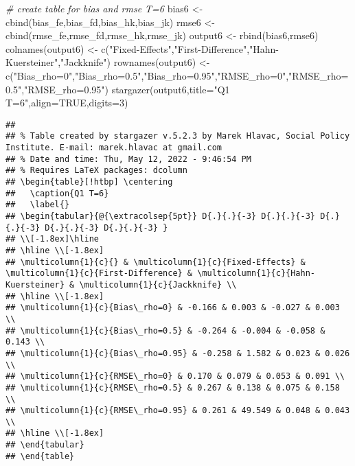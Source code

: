 \documentclass[
]{article}
\newenvironment{Shaded}{\begin{snugshade}}{\end{snugshade}}
\newcommand{\AttributeTok}[1]{\textcolor[rgb]{0.77,0.63,0.00}{#1}}
\newcommand{\CommentTok}[1]{\textcolor[rgb]{0.56,0.35,0.01}{\textit{#1}}}
\newcommand{\ConstantTok}[1]{\textcolor[rgb]{0.00,0.00,0.00}{#1}}
\newcommand{\DecValTok}[1]{\textcolor[rgb]{0.00,0.00,0.81}{#1}}
\newcommand{\FunctionTok}[1]{\textcolor[rgb]{0.00,0.00,0.00}{#1}}
\newcommand{\NormalTok}[1]{#1}
\newcommand{\OtherTok}[1]{\textcolor[rgb]{0.56,0.35,0.01}{#1}}
\newcommand{\StringTok}[1]{\textcolor[rgb]{0.31,0.60,0.02}{#1}}
\begin{document}
\begin{Shaded}
\begin{Highlighting}[]
\CommentTok{\# create table for bias and rmse T=6}
\NormalTok{bias6 }\OtherTok{\textless{}{-}} \FunctionTok{cbind}\NormalTok{(bias\_fe,bias\_fd,bias\_hk,bias\_jk)}
\NormalTok{rmse6 }\OtherTok{\textless{}{-}} \FunctionTok{cbind}\NormalTok{(rmse\_fe,rmse\_fd,rmse\_hk,rmse\_jk)}
\NormalTok{output6 }\OtherTok{\textless{}{-}} \FunctionTok{rbind}\NormalTok{(bias6,rmse6)}
\FunctionTok{colnames}\NormalTok{(output6) }\OtherTok{\textless{}{-}} \FunctionTok{c}\NormalTok{(}\StringTok{"Fixed{-}Effects"}\NormalTok{,}\StringTok{"First{-}Difference"}\NormalTok{,}\StringTok{"Hahn{-}Kuersteiner"}\NormalTok{,}\StringTok{"Jackknife"}\NormalTok{)}
\FunctionTok{rownames}\NormalTok{(output6) }\OtherTok{\textless{}{-}} \FunctionTok{c}\NormalTok{(}\StringTok{"Bias\_rho=0"}\NormalTok{,}\StringTok{"Bias\_rho=0.5"}\NormalTok{,}\StringTok{"Bias\_rho=0.95"}\NormalTok{,}\StringTok{"RMSE\_rho=0"}\NormalTok{,}\StringTok{"RMSE\_rho=0.5"}\NormalTok{,}\StringTok{"RMSE\_rho=0.95"}\NormalTok{)}
\FunctionTok{stargazer}\NormalTok{(output6,}\AttributeTok{title=}\StringTok{"Q1 T=6"}\NormalTok{,}\AttributeTok{align=}\ConstantTok{TRUE}\NormalTok{,}\AttributeTok{digits=}\DecValTok{3}\NormalTok{)}
\end{Highlighting}
\end{Shaded}

\begin{verbatim}
## 
## % Table created by stargazer v.5.2.3 by Marek Hlavac, Social Policy Institute. E-mail: marek.hlavac at gmail.com
## % Date and time: Thu, May 12, 2022 - 9:46:54 PM
## % Requires LaTeX packages: dcolumn 
## \begin{table}[!htbp] \centering 
##   \caption{Q1 T=6} 
##   \label{} 
## \begin{tabular}{@{\extracolsep{5pt}} D{.}{.}{-3} D{.}{.}{-3} D{.}{.}{-3} D{.}{.}{-3} D{.}{.}{-3} } 
## \\[-1.8ex]\hline 
## \hline \\[-1.8ex] 
## \multicolumn{1}{c}{} & \multicolumn{1}{c}{Fixed-Effects} & \multicolumn{1}{c}{First-Difference} & \multicolumn{1}{c}{Hahn-Kuersteiner} & \multicolumn{1}{c}{Jackknife} \\ 
## \hline \\[-1.8ex] 
## \multicolumn{1}{c}{Bias\_rho=0} & -0.166 & 0.003 & -0.027 & 0.003 \\ 
## \multicolumn{1}{c}{Bias\_rho=0.5} & -0.264 & -0.004 & -0.058 & 0.143 \\ 
## \multicolumn{1}{c}{Bias\_rho=0.95} & -0.258 & 1.582 & 0.023 & 0.026 \\ 
## \multicolumn{1}{c}{RMSE\_rho=0} & 0.170 & 0.079 & 0.053 & 0.091 \\ 
## \multicolumn{1}{c}{RMSE\_rho=0.5} & 0.267 & 0.138 & 0.075 & 0.158 \\ 
## \multicolumn{1}{c}{RMSE\_rho=0.95} & 0.261 & 49.549 & 0.048 & 0.043 \\ 
## \hline \\[-1.8ex] 
## \end{tabular} 
## \end{table}
\end{verbatim}
\end{document}
